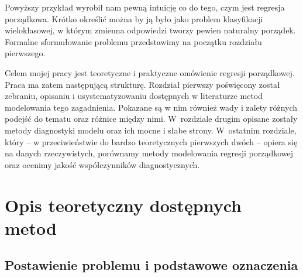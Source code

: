 \documentclass{mini}
\begin{document}
Powyższy przykład wyrobił nam pewną intuicję co do tego, czym jest regresja porządkowa. Krótko określić można by ją było jako problem klasyfikacji wieloklasowej, w którym zmienna odpowiedzi tworzy pewien naturalny porządek. Formalne sformułowanie problemu przedstawimy na początku rozdziału pierwszego.

Celem mojej pracy jest teoretyczne i praktyczne omówienie regresji porządkowej. Praca ma zatem następującą strukturę. Rozdział pierwszy poświęcony został zebraniu, opisaniu i usystematyzowaniu dostępnych w literaturze metod modelowania tego zagadnienia. Pokazane są w nim również wady i zalety różnych podejść do tematu oraz różnice między nimi. W~rozdziale drugim opisane zostały metody diagnostyki modelu oraz ich mocne i słabe strony. W~ostatnim rozdziale, który -- w przeciwieństwie do bardzo teoretycznych pierwszych dwóch -- opiera się na danych rzeczywistych, porównamy metody modelowania regresji porządkowej oraz ocenimy jakość współczynników diagnostycznych.       


%


\chapter{Opis teoretyczny dostępnych metod}


\section{Postawienie problemu i podstawowe oznaczenia}
\end{document}
